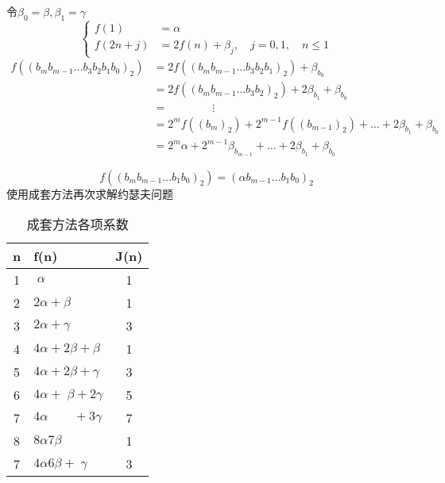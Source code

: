 \documentclass[mode=geye]{elegantnote}
\begin{document}
令$ \beta_0 = \beta, \beta_1 = \gamma $
\begin{equation*}
	\left\{
	\begin{aligned}
		f(1)    &= \alpha  \\
		f(2n+j) &= 2f(n) + \beta_j, \quad j=0,1, \quad n\leqslant 1  
	\end{aligned}
	\right.
\end{equation*}
\begin{align*}
	    f((b_m b_{m-1}\dots b_3 b_2 b_1 b_0)_2) 
	&= 2f((b_m b_{m-1}\dots b_3 b_2 b_1)_2)     +  \beta_{b_0}  \\
	&= 2f((b_m b_{m-1}\dots b_3 b_2)_2)         + 2\beta_{b_1}+ \beta_{b_0}  \\
	&=\qquad\qquad\vdots\\
	&= 2^{m} f((b_{m})_2) + 2^{m-1} f((b_{m-1})_2) + \dots + 2\beta_{b_1}+ \beta_{b_0}  \\
	&= 2^{m} \alpha + 2^{m-1} \beta_{b_{m-1}} + \dots + 2\beta_{b_1}+ \beta_{b_0}  
\end{align*}

\begin{equation*}
    f((b_m b_{m-1}\dots b_1 b_0)_2) = (\alpha b_{m-1}\dots b_1 b_0)_2
\end{equation*}
使用成套方法再次求解约瑟夫问题
\begin{table}[htbp]
	\centering
	\small
	\caption{成套方法各项系数}
		\begin{tabular}{c|l c}
			\toprule
			n & f(n)                             & J(n)  \\
			\midrule
			1 & $ \;\alpha $                     & 1     \\
			2 & $ 2\alpha + \beta  $             & 1     \\
			3 & $ 2\alpha + \gamma $             & 3     \\ 
			4 & $ 4\alpha + 2\beta  + \beta $    & 1     \\ 
			5 & $ 4\alpha + 2\beta  + \gamma $   & 3     \\ 
			6 & $ 4\alpha + \;\beta + 2\gamma $  & 5     \\ 
			7 & $ 4\alpha \qquad + 3\gamma $     & 7     \\ 
			8 & $ 8\alpha 7\beta $               & 1     \\ 
			7 & $ 4\alpha 6\beta + \;\gamma $    & 3     \\ 
			\bottomrule
		\end{tabular}%
	\label{tab:fnLists002}%
\end{table}%
\end{document}
